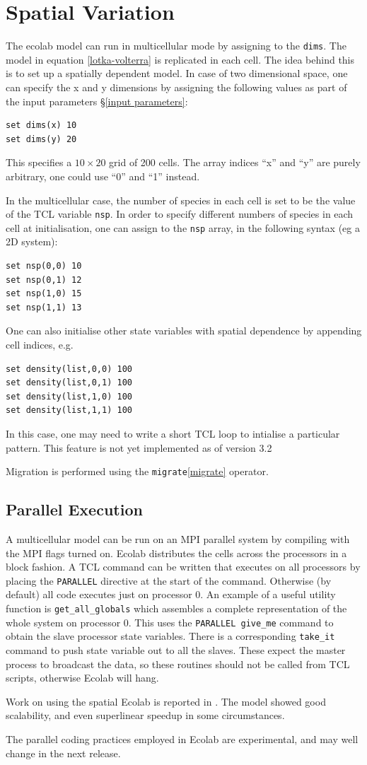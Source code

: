 \section{Spatial Variation}\label{spatial}

The ecolab model can run in multicellular mode by assigning to the
{\tt dims}. The model in equation \ref{lotka-volterra} is replicated
in each cell. The idea behind this is to set up a spatially dependent
model. In case of two dimensional space, one can specify the x and y
dimensions by assigning the following values as part of the input
parameters \S\ref{input parameters}:
\begin{verbatim}
set dims(x) 10
set dims(y) 20
\end{verbatim}
This specifies a $10\times20$ grid of 200 cells.
The array indices ``x'' and ``y'' are purely arbitrary, one could use
``0'' and ``1'' instead.

In the multicellular case, the number of species in each cell is set
to be the value of the TCL variable {\tt nsp}. In order to specify
different numbers of species in each cell at initialisation, one can
assign to the {\tt nsp} array, in the following syntax (eg a 2D
system):
\begin{verbatim}
set nsp(0,0) 10
set nsp(0,1) 12
set nsp(1,0) 15
set nsp(1,1) 13
\end{verbatim}

One can also initialise other state variables with spatial dependence
by appending cell indices, e.g.
\begin{verbatim}
set density(list,0,0) 100
set density(list,0,1) 100
set density(list,1,0) 100
set density(list,1,1) 100
\end{verbatim}
In this case, one may need to write a short TCL loop to intialise a
particular pattern. This feature is not yet implemented as of version 3.2

Migration is performed using the {\tt migrate}\ref{migrate} operator.

\subsection{Parallel Execution}

A multicellular model can be run on an MPI parallel system by
compiling with the MPI flags turned on. Ecolab distributes the cells
across the processors in a block fashion. A TCL command can be
written that executes on all processors by placing the {\tt PARALLEL}
directive at the start of the command. Otherwise (by default) all code
executes just on processor 0. An example of a useful utility function is
{\tt get\_all\_globals} which assembles a complete representation of
the whole system on processor 0. This uses the {\tt PARALLEL give\_me}
command to obtain the slave processor state variables. There is a
corresponding {\tt take\_it} command to push state variable out to all
the slaves. These expect the master process to broadcast the data, so
these routines should not be called from TCL scripts, otherwise Ecolab
will hang.

Work on using the spatial Ecolab is reported in
\cite{Standish98c}. The model showed good scalability, and even
superlinear speedup in some circumstances.

The parallel coding practices employed in Ecolab are experimental, and
may well change in the next release.

